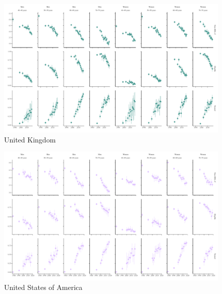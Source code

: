 \documentclass[12pt]{article}
\begin{document}
\begin{appendix}
\begin{landscape}
        \begin{figure}[H]
            \centering
            \includegraphics[width=\linewidth]{../3_figures/countries/fig_united kingdom.pdf}
            \caption{United Kingdom}
            \label{fig:uk}
        \end{figure}

        \begin{figure}[H]
            \centering
            \includegraphics[width=\linewidth]{../3_figures/countries/fig_united states of america.pdf}
            \caption{United States of America}
            \label{fig:usa}
        \end{figure}
    \end{landscape}


    
\end{appendix}

\end{document}
